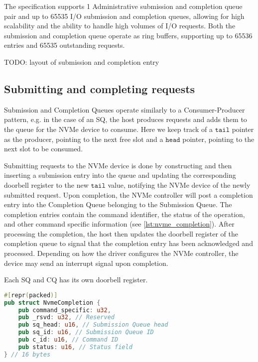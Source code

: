 The specification supports 1 Administrative submission and completion queue pair and up to 65535 I/O submission and completion queues, allowing for high scalability and the ability to handle high volumes of I/O requests. Both the submission and completion queue operate as ring buffers, supporting up to 65536 entries and 65535 outstanding requests.

TODO: layout of submission and completion entry

\subsection{Submitting and completing requests}
Submission and Completion Queues operate similarly to a Consumer-Producer pattern, e.g. in the case of an SQ, the host produces requests and adds them to the queue for the NVMe device to consume. Here we keep track of a $\texttt{tail}$ pointer as the producer, pointing to the next free slot and a $\texttt{head}$ pointer, pointing to the next slot to be consumed.

Submitting requests to the NVMe device is done by constructing and then inserting a submission entry into the queue and updating the corresponding doorbell register to the new $\texttt{tail}$ value, notifying the NVMe device of the newly submitted request. Upon completion, the NVMe controller will post a completion entry into the Completion Queue belonging to the Submission Queue. The completion entries contain the command identifier, the status of the operation, and other command specific information (see \ref{lst:nvme_completion}). After processing the completion, the host then updates the doorbell register of the completion queue to signal that the completion entry has been acknowledged and processed. Depending on how the driver configures the NVMe controller, the device may send an interrupt signal upon completion.

Each SQ and CQ has its own doorbell register.



\begin{lstlisting}[float,language=Rust,label=lst:nvme_completion,caption=NVMe completion entry defined as a struct in Rust]
#[repr(packed)]
pub struct NvmeCompletion {
    pub command_specific: u32,
    pub _rsvd: u32, // Reserved
    pub sq_head: u16, // Submission Queue head
    pub sq_id: u16, // Submission Queue ID
    pub c_id: u16, // Command ID
    pub status: u16, // Status field
} // 16 bytes
\end{lstlisting}

